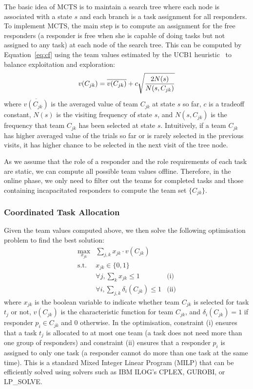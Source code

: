 The basic idea of MCTS is to maintain a search tree where each node
is associated with a state $s$ and each branch is a task assignment
for all responders. To implement MCTS, the main step is to compute
an assignment for the free responders (a responder is free when she
is capable of doing tasks but not assigned to any task) at each
node of the search tree. This can be computed by
Equation~\ref{eq:cf} using the team values estimated by the UCB1
heuristic~\cite{auer2002finite} to balance exploitation and
exploration:
\begin{equation}\small
  v(C_{jk}) = \overline{v(C_{jk})} + c\sqrt{\frac{2N(s)}{N(s, C_{jk})}}
\end{equation}
where $\overline{v(C_{jk})}$ is the averaged value of team $C_{jk}$
at state $s$ so far, $c$ is a tradeoff constant, $N(s)$ is the
visiting frequency of state $s$, and $N(s, C_{jk})$ is the
frequency that team $C_{jk}$ has been selected at state $s$.
Intuitively, if a team $C_{jk}$ has higher averaged value of the
trials so far or is rarely selected in the previous visits, it has
higher chance to be selected in the next visit of the tree node.

As we assume that the role of a responder and the role requirements
of each task are static, we can compute all possible team values
offline. Therefore, in the online phase, we only need to filter out
the teams for completed tasks and those containing
incapacitated responders to compute the team set $\{ C_{jk} \}$.

\subsubsection{Coordinated Task Allocation}
\noindent Given the team values computed above, we then solve the
following optimisation problem to find the best solution:
\begin{equation}
  \begin{array}{lll}
    \max\limits_{x_{jk}} & \sum_{j, k} x_{jk} \cdot v(C_{jk}) & \\[2pt]
    \mbox{s.t.} & x_{jk} \in \{0, 1\} & \\[2pt]
    & \forall j, \sum_{k} x_{jk} \leq 1 & \mbox{(i)} \\[2pt]
    & \forall i, \sum_{j, k} \delta_i(C_{jk}) \leq 1 & \mbox{(ii)}
  \end{array}
  \label{eq:cf}
\end{equation}
where $x_{jk}$ is the boolean variable to indicate whether team
$C_{jk}$ is selected for task $t_j$ or not, $v(C_{jk})$ is the
characteristic function for team $C_{jk}$, and $\delta_i(C_{jk}) =
1$ if responder $p_i\in C_{jk}$ and 0 otherwise. In the
optimisation, constraint (i) ensures that a task $t_j$ is allocated
to at most one team (a task does not need more than one group of
responders) and constraint (ii) ensures that a responder $p_i$ is
assigned to only one task (a responder cannot do more than one task
at the same time). This is a standard Mixed Integer Linear Program
(MILP) that can be efficiently solved  using solvers such as IBM
ILOG's CPLEX, GUROBI, or LP\_SOLVE.

